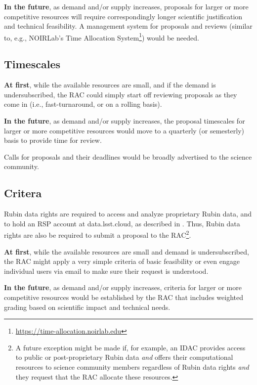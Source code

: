 \textbf{In the future}, as demand and/or supply increases, proposals for larger or more competitive resources will require correspondingly longer scientific justification and technical feasibility.
A management system for proposals and reviews (similar to, e.g., NOIRLab's Time Allocation System\footnote{\url{https://time-allocation.noirlab.edu}}) would be needed. 


\subsection{Timescales}\label{ssec:proposals-timescales}

\textbf{At first}, while the available resources are small, and if the demand is undersubscribed, the RAC could simply start off reviewing proposals as they come in (i.e., fast-turnaround, or on a rolling basis).

\textbf{In the future}, as demand and/or supply increases, the proposal timescales for larger or more competitive resources would move to a quarterly (or semesterly) basis to provide time for review.

Calls for proposals and their deadlines would be broadly advertised to the science community.


\subsection{Critera}\label{ssec:proposals-criteria}

Rubin data rights are required to access and analyze proprietary Rubin data, and to hold an RSP account at data.lsst.cloud, as described in .
Thus, Rubin data rights are also be required to submit a proposal to the RAC\footnote{A future exception might be made if, for example, an IDAC provides access to public or post-proprietary Rubin data \emph{and} offers their computational resources to science community members regardless of Rubin data rights \emph{and} they request that the RAC allocate these resources.}.

\textbf{At first}, while the available resources are small and demand is undersubscribed, the RAC might apply a very simple criteria of basic feasibility or even engage individual users via email to make sure their request is understood.

\textbf{In the future}, as demand and/or supply increases, criteria for larger or more competitive resources would be established by the RAC that includes weighted grading based on scientific impact and technical needs.

